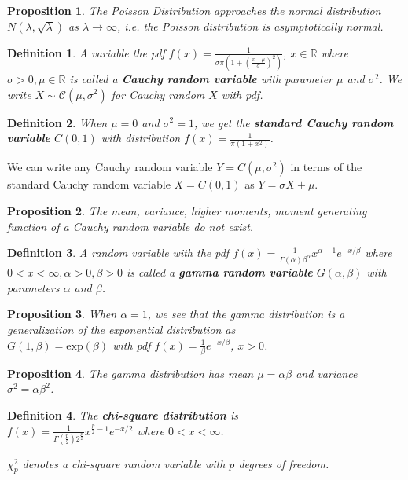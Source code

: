 \documentclass[14pt,twoside]{extreport}
\theoremstyle{dotless}
\newtheorem*{defn}{Definition}
\newtheorem*{prop}{Proposition} %
\begin{document}
\begin{prop}
    The Poisson Distribution approaches the normal distribution $N(\lambda, \sqrt{\lambda})$ as $\lambda \to \infty$, i.e. the Poisson distribution is asymptotically normal.
\end{prop}

\begin{defn}
    A variable the pdf $f(x) = \displaystyle \frac{1}{\sigma \pi (1 + \left( \frac{x - \mu}{\sigma} \right)^2 )}$, $x \in \mathbb{R}$ where $\sigma > 0, \mu \in \mathbb{R}$ is called a \textbf{Cauchy random variable} with parameter $\mu$ and $\sigma^2$.
    We write $X \sim \mathcal{C}(\mu, \sigma^2)$ for Cauchy random $X$ with pdf.
\end{defn}

\begin{defn}
    When $\mu = 0$ and $\sigma^2 = 1$, we get the \textbf{standard Cauchy random variable} $C(0,1)$ with distribution $f(x) = \displaystyle \frac{1}{\pi (1 + x^2)}$.
\end{defn}

We can write any Cauchy random variable $Y = C(\mu, \sigma^2)$ in terms of the standard Cauchy random variable $X = C(0,1)$ as $Y = \sigma X + \mu$.

\begin{prop}
The mean, variance, higher moments, moment generating function of a Cauchy random variable do not exist.
\end{prop}

\begin{defn}
    A random variable with the pdf $f(x) = \displaystyle  \frac{1}{\Gamma(\alpha) \beta^\alpha} x^{\alpha - 1} e^{-x/\beta}$ where $0 < x < \infty, \alpha > 0, \beta > 0$ is called a \textbf{gamma random variable} $G(\alpha, \beta)$ with parameters $\alpha$ and $\beta$.
\end{defn}
\begin{prop}
    When $\alpha=1$, we see that the gamma distribution is a generalization of the exponential distribution as \\
$G(1, \beta) = \text{exp}(\beta)$ with pdf $f(x) = \frac{1}{\beta} e^{-x/\beta}$, $x > 0$.
\end{prop}

\begin{prop}
The gamma distribution has mean $\mu = \alpha \beta$ and variance $\sigma^2 = \alpha \beta^2$.
\end{prop}

\begin{defn}
    The \textbf{chi-square distribution} is \\
    $f(x) = \displaystyle \frac{1}{\Gamma(\frac{p}{2}) 2^{\frac{p}{2}}} x^{\frac{p}{2} - 1} e ^{-x/2}$ where $0 < x < \infty$.

    \vspace{0.5cm}
    $\chi_p^2$ denotes a chi-square random variable with $p$ degrees of freedom.
\end{defn}
\end{document}
